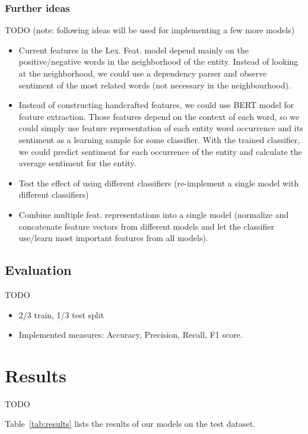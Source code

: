 \documentclass[11pt,a4paper]{article}
\begin{document}
\subsubsection{Further ideas}

TODO (note: following ideas will be used for implementing a few more models)
\begin{itemize}
    \item Current features in the Lex. Feat. model depend mainly on the positive/negative words in the neighborhood of the entity. Instead of looking at the neighborhood, we could use a dependency parser and observe sentiment of the most related words (not necessary in the neighbourhood).
    \item Instead of constructing handcrafted features, we could use BERT model for feature extraction. Those features depend on the context of each word, so we could simply use feature representation of each entity word occurrence and its sentiment as a learning sample for some classifier. With the trained classifier, we could predict sentiment for each occurrence of the entity and calculate the average sentiment for the entity.
    \item Test the effect of using different classifiers (re-implement a single model with different classifiers)
    \item Combine multiple feat. representations into a single model (normalize and concatenate feature vectors from different models and let the classifier use/learn most important features from all models).
\end{itemize}

\subsection{Evaluation}

TODO
\begin{itemize}
    \item 2/3 train, 1/3 test split
    \item Implemented measures: Accuracy, Precision, Recall, F1 score.
\end{itemize}



\section{Results}

TODO

Table~\ref{tab:results} lists the results of our models on the test dataset.
\end{document}

